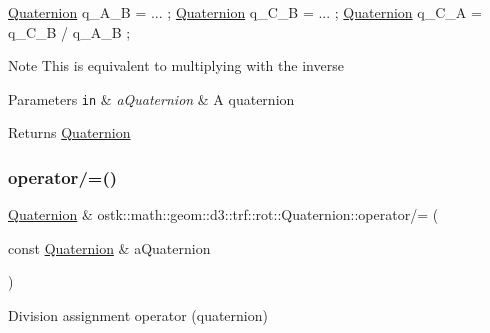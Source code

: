 \begin{DoxyCode}
\hyperlink{classostk_1_1math_1_1geom_1_1d3_1_1trf_1_1rot_1_1_quaternion_ad9fd7d8eb5effb4d4e0394bbb5bb86dc}{Quaternion} q\_A\_B = ... ;
\hyperlink{classostk_1_1math_1_1geom_1_1d3_1_1trf_1_1rot_1_1_quaternion_ad9fd7d8eb5effb4d4e0394bbb5bb86dc}{Quaternion} q\_C\_B = ... ;
\hyperlink{classostk_1_1math_1_1geom_1_1d3_1_1trf_1_1rot_1_1_quaternion_ad9fd7d8eb5effb4d4e0394bbb5bb86dc}{Quaternion} q\_C\_A = q\_C\_B / q\_A\_B ;
\end{DoxyCode}


\begin{DoxyNote}{Note}
This is equivalent to multiplying with the inverse
\end{DoxyNote}

\begin{DoxyParams}[1]{Parameters}
\mbox{\tt in}  & {\em a\+Quaternion} & A quaternion \\
\hline
\end{DoxyParams}
\begin{DoxyReturn}{Returns}
\hyperlink{classostk_1_1math_1_1geom_1_1d3_1_1trf_1_1rot_1_1_quaternion}{Quaternion} 
\end{DoxyReturn}
\mbox{\label{classostk_1_1math_1_1geom_1_1d3_1_1trf_1_1rot_1_1_quaternion_aee3bd39ff2bb79ed0817e1995329fe17}} 
\subsubsection{\texorpdfstring{operator/=()}{operator/=()}}
{\footnotesize\ttfamily \hyperlink{classostk_1_1math_1_1geom_1_1d3_1_1trf_1_1rot_1_1_quaternion}{Quaternion} \& ostk\+::math\+::geom\+::d3\+::trf\+::rot\+::\+Quaternion\+::operator/= (\begin{DoxyParamCaption}\item[{const \hyperlink{classostk_1_1math_1_1geom_1_1d3_1_1trf_1_1rot_1_1_quaternion}{Quaternion} \&}]{a\+Quaternion }\end{DoxyParamCaption})}



Division assignment operator (quaternion) 


